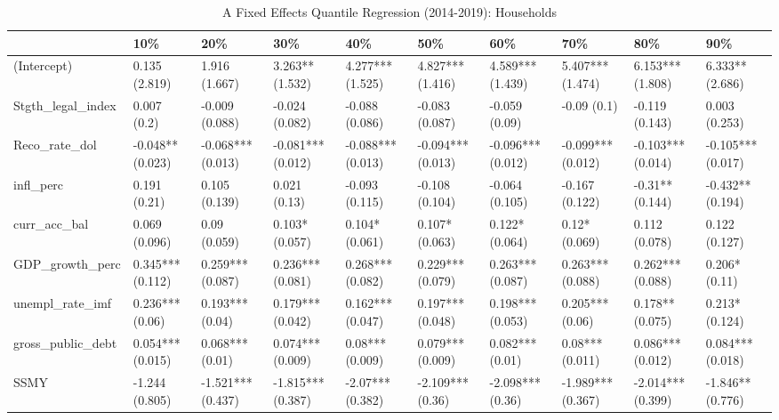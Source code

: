\begin{table}[ht]
\centering
\caption{A Fixed Effects Quantile Regression (2014-2019): Households} 
\begingroup\small
\begin{tabular}{llllllllll}
  \toprule
 & 10\% & 20\% & 30\% & 40\% & 50\% & 60\% & 70\% & 80\% & 90\% \\ 
  \midrule
(Intercept) & 0.135 (2.819) & 1.916 (1.667) & 3.263** (1.532) & 4.277*** (1.525) & 4.827*** (1.416) & 4.589*** (1.439) & 5.407*** (1.474) & 6.153*** (1.808) & 6.333** (2.686) \\ 
  Stgth\_legal\_index & 0.007 (0.2) & -0.009 (0.088) & -0.024 (0.082) & -0.088 (0.086) & -0.083 (0.087) & -0.059 (0.09) & -0.09 (0.1) & -0.119 (0.143) & 0.003 (0.253) \\ 
  Reco\_rate\_dol & -0.048** (0.023) & -0.068*** (0.013) & -0.081*** (0.012) & -0.088*** (0.013) & -0.094*** (0.013) & -0.096*** (0.012) & -0.099*** (0.012) & -0.103*** (0.014) & -0.105*** (0.017) \\ 
  infl\_perc & 0.191 (0.21) & 0.105 (0.139) & 0.021 (0.13) & -0.093 (0.115) & -0.108 (0.104) & -0.064 (0.105) & -0.167 (0.122) & -0.31** (0.144) & -0.432** (0.194) \\ 
  curr\_acc\_bal & 0.069 (0.096) & 0.09 (0.059) & 0.103* (0.057) & 0.104* (0.061) & 0.107* (0.063) & 0.122* (0.064) & 0.12* (0.069) & 0.112 (0.078) & 0.122 (0.127) \\ 
  GDP\_growth\_perc & 0.345*** (0.112) & 0.259*** (0.087) & 0.236*** (0.081) & 0.268*** (0.082) & 0.229*** (0.079) & 0.263*** (0.087) & 0.263*** (0.088) & 0.262*** (0.088) & 0.206* (0.11) \\ 
  unempl\_rate\_imf & 0.236*** (0.06) & 0.193*** (0.04) & 0.179*** (0.042) & 0.162*** (0.047) & 0.197*** (0.048) & 0.198*** (0.053) & 0.205*** (0.06) & 0.178** (0.075) & 0.213* (0.124) \\ 
  gross\_public\_debt & 0.054*** (0.015) & 0.068*** (0.01) & 0.074*** (0.009) & 0.08*** (0.009) & 0.079*** (0.009) & 0.082*** (0.01) & 0.08*** (0.011) & 0.086*** (0.012) & 0.084*** (0.018) \\ 
  SSMY & -1.244 (0.805) & -1.521*** (0.437) & -1.815*** (0.387) & -2.07*** (0.382) & -2.109*** (0.36) & -2.098*** (0.36) & -1.989*** (0.367) & -2.014*** (0.399) & -1.846** (0.776) \\ 
   \bottomrule
\end{tabular}
\endgroup
\end{table}

